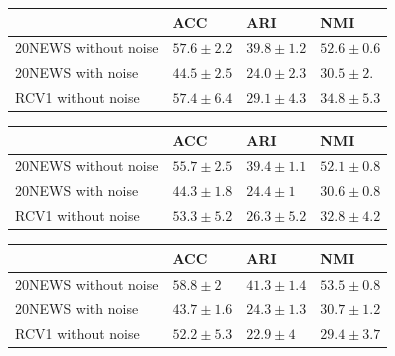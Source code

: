 \begin{table}[h]
\begin{tabular}{|l|l|l|l|}
  \end{tabular}
  \begin{tabular}{|l|l|l|l|}
    \hline
    & ACC                  &ARI                   & NMI                   \\ \hline
    20NEWS without noise   &$57.6\pm 2.2$  &$39.8\pm 1.2$    &$52.6\pm 0.6$ \\ \hline
    20NEWS with noise      &\boldmath$44.5\pm 2.5$  &\boldmath$24.0\pm 2.3$&\boldmath$30.5\pm 2.$ \\ \hline
    RCV1 without noise     &$57.4\pm 6.4$&$29.1\pm 4.3$&$34.8 \pm 5.3$  \\ \hline
  \end{tabular}
  \begin{tabular}{|l|l|l|l|}
    \hline
    & ACC                  &ARI                   & NMI                   \\ \hline
    20NEWS without noise   &$55.7\pm 2.5$  &$39.4\pm 1.1$    &$52.1\pm 0.8$ \\ \hline
    20NEWS with noise      &$44.3\pm 1.8$  &\boldmath$24.4\pm 1$&$30.6\pm 0.8$ \\ \hline
    RCV1 without noise     &$53.3\pm 5.2$&$26.3\pm 5.2$&$32.8 \pm 4.2$  \\ \hline
  \end{tabular}
  \begin{tabular}{|l|l|l|l|}
    \hline
    & ACC                  &ARI                   & NMI                   \\ \hline
    20NEWS without noise   &\boldmath$58.8\pm 2$  &\boldmath$41.3\pm 1.4$    &\boldmath$53.5\pm 0.8$ \\ \hline
    20NEWS with noise      &$43.7\pm 1.6$  &$24.3\pm 1.3$&\boldmath$30.7\pm 1.2$ \\ \hline
    RCV1 without noise     &$52.2\pm 5.3$&$22.9\pm 4$&$29.4 \pm 3.7$  \\ \hline
  \end{tabular}
\end{table}

